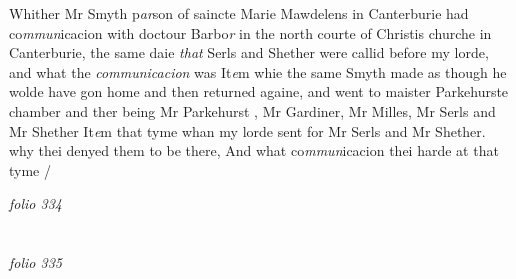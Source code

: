 \documentclass[12pt, a4paper]{book}
\begin{document}
				\marginpar[\vspace{0.5cm}{\textcolor{Gray}{10}}]{}
			 Whither Mr Smyth p\textit{ar}son of saincte Marie Mawdelens in  Canterburie had co\textit{mmun}icacion with doctour Barbo\textit{r} in the north courte of Christis churche in Canterburie, the same daie \textit{that}  Serls and Shether were callid before my lorde, and what  the \textit{communicacion} was  
				\marginpar[\vspace{0.5cm}{\textcolor{Gray}{11}}]{}
			 It\textit{e}m whie the same Smyth made as though he wolde have gon home and then returned againe, and went to maister Parkehurste chamber and ther being Mr Parkehurst
			, Mr Gardiner, Mr Milles, Mr Serls and Mr Shether  
				\marginpar[\vspace{0.5cm}{\textcolor{Gray}{12}}]{}
			 It\textit{e}m that tyme whan my lorde sent for Mr Serls and  Mr Shether. why thei denyed them to be there, And what  co\textit{mmun}icacion thei harde at that tyme /

\dotfill
					

\textit{folio 334}


         \vspace{4cm}
         
\dotfill
					  \section*{}  \subsection*{}

\textit{folio 335}
\end{document}
